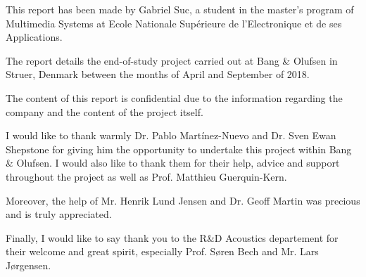 \documentclass[
11pt, %
english, %
singlespacing, %
headsepline, %
]{MastersDoctoralThesis} %
\begin{document}


\begin{preface}
	\addchaptertocentry{\prefacename} %
	
	This report has been made by Gabriel Suc, a student in the master's program of Multimedia Systems at Ecole Nationale Supérieure de l'Electronique et de ses Applications. 
	
	The report details the end-of-study project carried out at Bang \& Olufsen in Struer, Denmark between the months of April and September of 2018. 
	
	The content of this report is confidential due to the information regarding the company and the content of the project itself.
	
\end{preface}


\begin{acknowledgements}
\addchaptertocentry{\acknowledgementname} %

I would like to thank warmly Dr. Pablo Martínez-Nuevo and Dr. Sven Ewan Shepstone for giving him the opportunity to undertake this project within Bang \& Olufsen. I would also like to thank them for their help, advice and support throughout the project as well as Prof. Matthieu Guerquin-Kern.

Moreover, the help of Mr. Henrik Lund Jensen and Dr. Geoff Martin was precious and is truly appreciated.

Finally, I would like to say thank you to the R\&D Acoustics departement for their welcome and great spirit, especially Prof. Søren Bech and Mr. Lars Jørgensen.

\end{acknowledgements}
\end{document}
